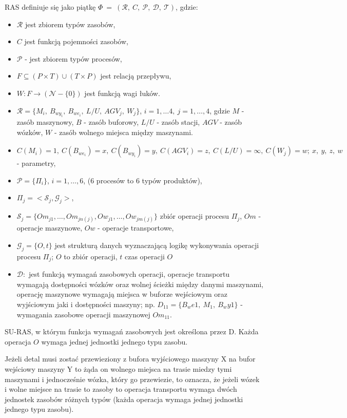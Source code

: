 \documentclass[10pt, a4paper]{article}
\begin{document}
RAS definiuje się jako piątkę $\Phi \ =\ (\mathcal{R},\ C,\ \mathcal{P},\ \mathcal{D},\ \mathcal{T})$, gdzie:
\begin{itemize}
\item $\mathcal{R}$ jest zbiorem typów zasobów,
\item $C$ jest funkcją pojemności zasobów,
\item $\mathcal{P}$ - jest zbiorem typów procesów,
\item $F \subseteq (P\times T)\cup (T\times P)$ jest relacją przepływu,
\item $W:F\to (\mathcal{N}-\{0\})$ jest funkcją wagi łuków.
\item $\mathcal{R}=\{M_i,\ B_{wy_i},\ B_{we_i},\ L/U,\ AGV_j,\ W_j\}$, $i=1,\dots 4,\ j=1,\dots, 4$, gdzie $M$ - zasób maszynowy, $B$ - zasób buforowy, $L/U$ - zasób stacji, $AGV$ - zasób wózków, $W$ - zasób wolnego miejsca między maszynami.
\item $C(M_i)=1,\ C(B_{we_i})=x,\ C(B_{wy_i})=y,\ C(AGV_i)=z,\ C(L/U)=\infty,\ C(W_j)=w;\ x,\ y,\ z,\ w$ - parametry,
\item $\mathcal{P}=\{\Pi_i\}$, $i=1,\dots, 6$, (6 procesów to 6 typów produktów),
\item $\Pi_j=\big<\mathcal{S}_j,\mathcal{G}_j\big>$,
\item $\mathcal{S}_j=\{Om_{j1},\dots ,Om_{jn(j)}, Ow_{j1},\dots ,Ow_{jm(j)} \}$ zbiór operacji procesu $\Pi_j$, $Om$ - operacje maszynowe, $Ow$ - operacje transportowe,
\item $\mathcal{G}_j=\{O, t\}$ jest strukturą danych wyznaczającą logikę wykonywania operacji procesu $\Pi_j$; $O$ to zbiór operacji, $t$ czas operacji $O$
\item $\mathcal{D}:$  jest funkcją wymagań zasobowych operacji, operacje transportu wymagają dostępności wózków oraz wolnej ścieżki między danymi maszynami, operację maszynowe wymagają miejsca w buforze wejściowym oraz wyjściowym jaki i dostępności maszyny; np. $D_{11}=\{B_we1,\ M_1,\ B_wy1\}$ - wymagania zasobowe operacji maszynowej $Om_{11}$.


\end{itemize}
SU-RAS, w którym funkcja wymagań zasobowych jest określona przez D. Każda operacja $O$ wymaga jednej jednostki jednego typu zasobu.

Jeżeli detal musi zostać przewieziony z bufora wyjściowego maszyny X na bufor wejściowy maszyny Y to żąda on wolnego miejsca na trasie miedzy tymi maszynami i jednocześnie wózka, który go przewiezie, to oznacza, że jeżeli wózek i wolne miejsce na trasie to zasoby to operacja transportu wymaga dwóch jednostek zasobów różnych typów (każda operacja wymaga jednej jednostki jednego typu zasobu).
\end{document}
